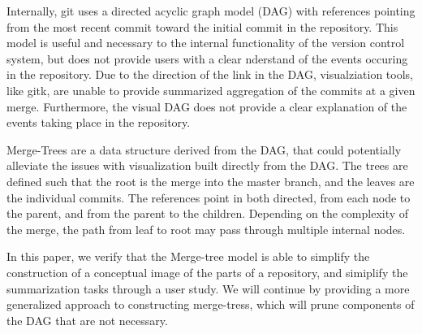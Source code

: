 Internally, git uses a directed acyclic graph model (DAG) with references
pointing from the most recent commit  toward the initial commit in the repository. This model is
useful and necessary to the internal functionality of the version
control system, but does not provide users with a clear nderstand of the
events occuring in the repository. Due to the direction of the link in
the DAG, visualziation tools, like gitk, are unable to provide
summarized aggregation of the commits at a given merge.  Furthermore,
the visual DAG does not provide a clear explanation of the events taking
place in the repository.

Merge-Trees are a data structure derived from the DAG, that could
potentially alleviate the issues with visualization built directly from
the DAG. The trees are defined such that the root is the merge into the
master branch, and the leaves are the individual commits. The references
point in both directed, from each node to the parent, and from the
parent to the children. Depending on the complexity of the merge, the
path from leaf to root may pass through multiple internal nodes.

In this paper, we verify that the Merge-tree model is able to simplify
the construction of a conceptual image of the parts of a repository, and
simiplify the summarization tasks through a user study. We will continue
by providing a more generalized approach to constructing merge-tress,
which will prune components of the DAG that are not necessary.


